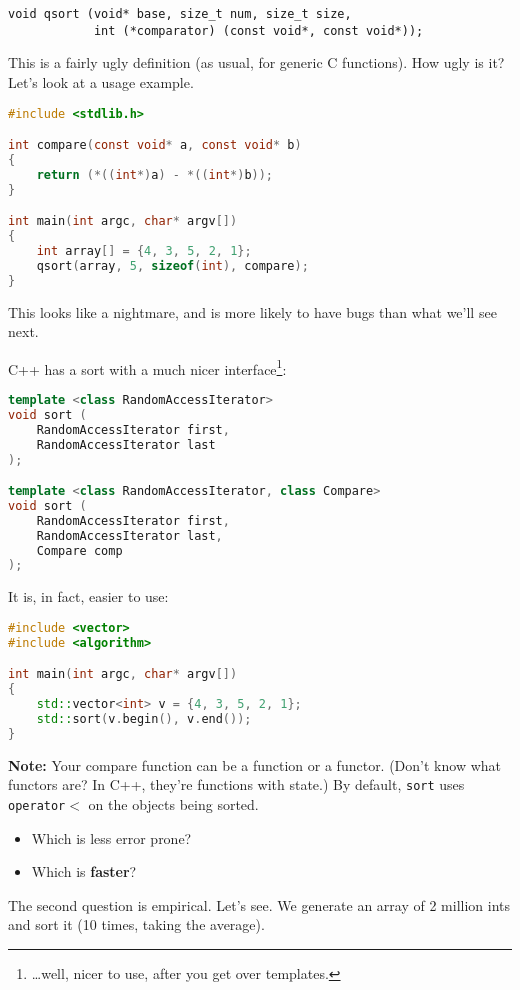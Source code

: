  \begin{lstlisting}
void qsort (void* base, size_t num, size_t size,
            int (*comparator) (const void*, const void*));
  \end{lstlisting}

This is a fairly ugly definition (as usual, for generic C functions). How ugly is it?
Let's look at a usage example.
  \begin{lstlisting}[language=C]
#include <stdlib.h>

int compare(const void* a, const void* b)
{
    return (*((int*)a) - *((int*)b));
}

int main(int argc, char* argv[])
{
    int array[] = {4, 3, 5, 2, 1};
    qsort(array, 5, sizeof(int), compare);
}
  \end{lstlisting}
This looks like a nightmare, and is more likely to have bugs than what we'll see next.


C++ has a sort with a much nicer interface\footnote{\ldots well, nicer to use, after you get over templates.}:

  \begin{lstlisting}[language=C++]
template <class RandomAccessIterator>
void sort (
    RandomAccessIterator first,
    RandomAccessIterator last
);

template <class RandomAccessIterator, class Compare>
void sort (
    RandomAccessIterator first,
    RandomAccessIterator last,
    Compare comp
);
  \end{lstlisting}
It is, in fact, easier to use:
  \begin{lstlisting}[language=C++]
#include <vector>
#include <algorithm>

int main(int argc, char* argv[])
{
    std::vector<int> v = {4, 3, 5, 2, 1};
    std::sort(v.begin(), v.end());
}
  \end{lstlisting}

{\bf Note:} Your compare function can be a function or a functor. (Don't know what functors
are? In C++, they're functions with state.) By default,
  {\tt sort} uses {\tt operator$<$} on the objects being sorted.

  \begin{itemize}
    \item Which is less error prone?
    \item Which is {\bf faster}?
  \end{itemize}

The second question is empirical. Let's see. We generate an array of 2 million ints
and sort it (10 times, taking the average).

